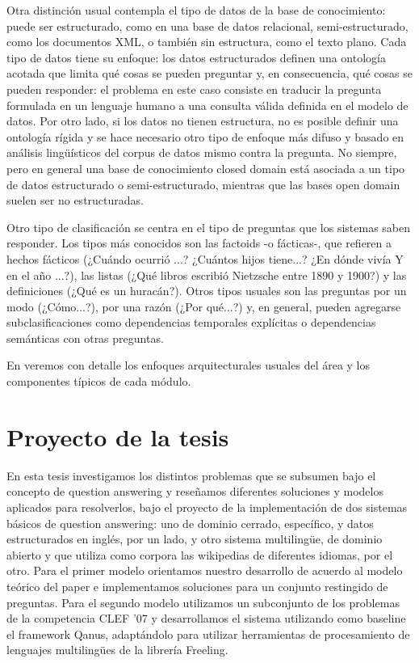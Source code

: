 Otra distinción usual contempla el tipo de datos de la base de conocimiento:  puede ser estructurado, como en una base de datos
relacional, semi-estructurado, como los documentos XML, o también sin estructura, como el texto plano. Cada tipo de datos tiene su enfoque:
los datos estructurados definen una ontología acotada que limita qué cosas se pueden preguntar y, en consecuencia, qué cosas se pueden responder: el problema en este caso consiste en traducir la pregunta formulada en un lenguaje humano a una consulta válida definida en el modelo de datos. Por otro lado, si los datos no tienen estructura, no es posible definir una ontología rígida y se hace necesario otro tipo de enfoque más difuso y basado en análisis lingüísticos del corpus de datos mismo contra la pregunta. No siempre,  pero en general una base de conocimiento closed domain está asociada a un tipo de datos estructurado o semi-estructurado, mientras que las bases open domain suelen ser no estructuradas.

Otro tipo de clasificación se centra en el tipo de preguntas que los sistemas saben responder. Los tipos más conocidos son las factoids -o fácticas-, que refieren a hechos fácticos (¿Cuándo ocurrió ...? ¿Cuántos hijos tiene...? ¿En dónde vivía Y en el año ...?), las listas (¿Qué libros escribió Nietzsche entre 1890 y 1900?) y las definiciones (¿Qué es un huracán?). Otros tipos usuales son las preguntas por un modo (¿Cómo...?), por una razón (¿Por qué...?) y, en general, pueden agregarse subclasificaciones como dependencias temporales explícitas o dependencias semánticas con otras preguntas.

En  veremos con detalle los enfoques arquitecturales usuales del área y los componentes típicos de cada módulo.

\section{Proyecto de la tesis}
\label{sec:proyecto}

En esta tesis investigamos los distintos problemas que se subsumen bajo el concepto de question answering y reseñamos diferentes soluciones y modelos aplicados para resolverlos, bajo el proyecto de la implementación de dos sistemas básicos de question answering: uno de dominio cerrado, específico, y datos estructurados en inglés, por un lado, y otro sistema multilingüe, de dominio abierto y que utiliza como corpora las wikipedias de diferentes idiomas, por el otro. Para el primer modelo orientamos nuestro desarrollo de acuerdo al modelo teórico del paper \cite{QADB1} e implementamos soluciones para un conjunto restingido de preguntas. Para el segundo modelo utilizamos   un subconjunto de los problemas de la competencia CLEF '07 y desarrollamos el sistema utilizando como baseline el framework Qanus, adaptándolo para utilizar herramientas de procesamiento de lenguajes multilingües de la librería Freeling.

